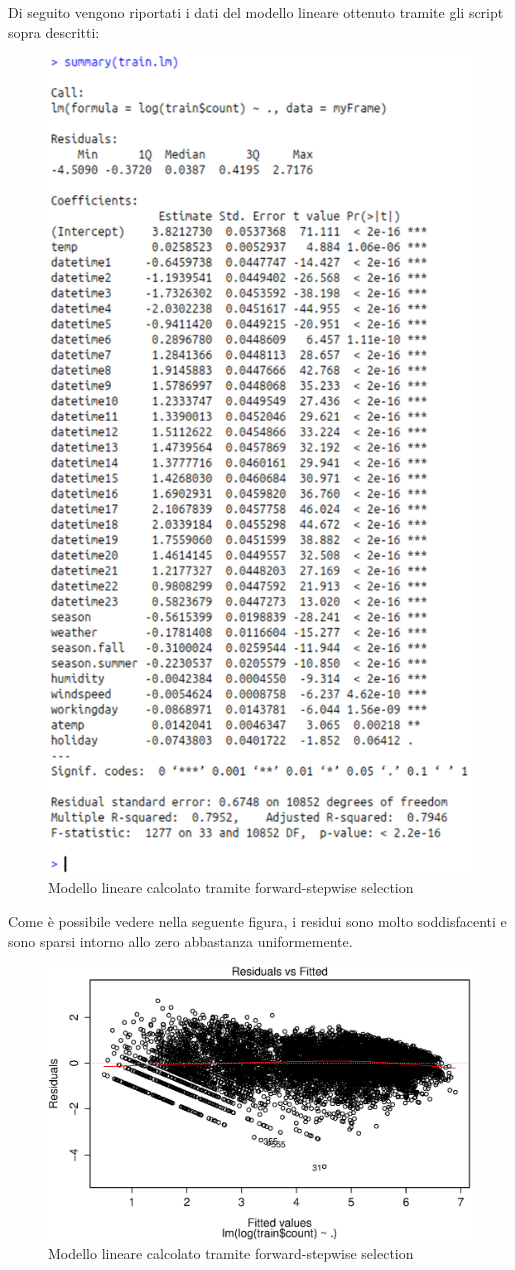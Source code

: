 Di seguito vengono riportati i dati del modello lineare ottenuto tramite gli
script sopra descritti:

\begin{figure}[H]
  \centering
  \includegraphics[width=.55\columnwidth]{images/lm/lm-after-fwd-steps.eps}
  \caption{Modello lineare calcolato tramite forward-stepwise selection}
    \label{fig:lm-after-fwd-steps}
\end{figure}

Come è possibile vedere nella seguente figura, i residui sono molto
soddisfacenti e sono sparsi intorno allo zero abbastanza uniformemente.

\begin{figure}[H]
  \centering
  \includegraphics[width=.55\columnwidth]{images/lm/fwd-sw-residuals.eps}
  \caption{Modello lineare calcolato tramite forward-stepwise selection}
    \label{fig:fwd-sw-residuals}
\end{figure}

